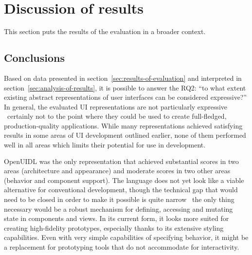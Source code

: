 \section{Discussion of results}\label{sec:evaluation-discussion-of-results}

This section puts the results of the evaluation in a broader context.

\subsection{Conclusions}\label{subsec:conclusions}

Based on data presented in section~\ref{sec:results-of-evaluation} and interpreted in section~\ref{sec:analysis-of-results}, it is possible to answer the RQ2: \enquote{to what extent existing abstract representations of user interfaces can be considered expressive?}
In general, the evaluated UI representations are not particularly expressive \textendash\ certainly not to the point where they could be used to create full-fledged, production-quality applications.
While many representations achieved satisfying results in some areas of UI development outlined earlier, none of them performed well in all areas which limits their potential for use in development.

OpenUIDL was the only representation that achieved substantial scores in two areas (architecture and appearance) and moderate scores in two other areas (behavior and component support).
The language does not yet look like a viable alternative for conventional development, though the technical gap that would need to be closed in order to make it possible is quite narrow \textendash\ the only thing necessary would be a robust mechanism for defining, accessing and mutating state in components and views.
In its current form, it looks more suited for creating high-fidelity prototypes, especially thanks to its extensive styling capabilities.
Even with very simple capabilities of specifying behavior, it might be a replacement for prototyping tools that do not accommodate for interactivity.

